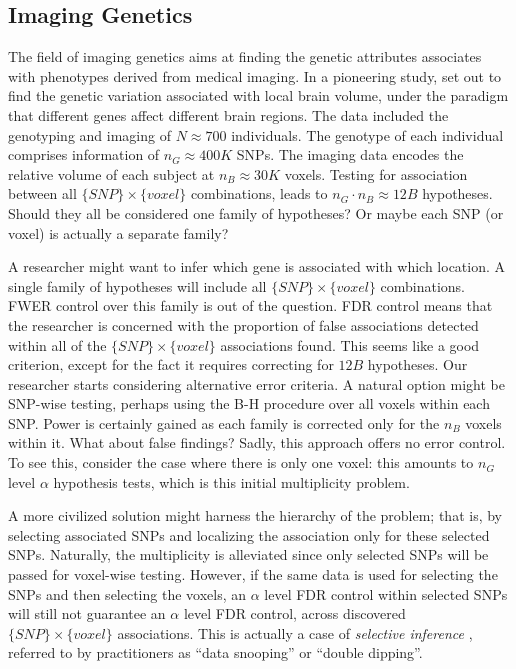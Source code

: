 \documentclass[review,12pt]{article}
\theoremstyle{definition}
\theoremstyle{definition}
\begin{document}
\subsection{\label{eg:imaging_genetics}Imaging Genetics}

The field of imaging genetics aims at finding the genetic attributes associates with phenotypes derived from medical imaging. In a pioneering study, \citet{stein_voxelwise_2010} set out to find the genetic variation associated with local brain volume, under the paradigm that different genes affect different brain regions. 
The data included the genotyping and imaging of $N \approx 700$ individuals. 
The genotype of each individual comprises information of $n_G \approx 400K$ SNPs. 
The imaging data encodes the relative volume of each subject at $n_B \approx 30K$ voxels. 
Testing for association between all $\{SNP\} \times \{voxel\}$ combinations, leads to $n_G \cdot n_B \approx 12B$ hypotheses. Should they all be considered one family of hypotheses? Or maybe each SNP (or voxel) is actually a separate family? 

A researcher might want to infer which gene is associated with which location.
A single family of hypotheses will include all $\{SNP\} \times \{voxel\}$ combinations. 
FWER control over this family is out of the question. 
FDR control means that the researcher is concerned with the proportion of false associations detected within all of the $\{SNP\} \times \{voxel\}$ associations found. This seems like a good criterion, except for the fact it requires correcting for $12B$ hypotheses. 
Our researcher starts considering alternative error criteria. 
A natural option might be SNP-wise testing, perhaps using the B-H procedure over all voxels within each SNP. Power is certainly gained as each family is corrected only for the $n_B$ voxels within it. 
What about false findings? Sadly, this approach offers no error control. To see this, consider the case where there is only one voxel: this amounts to $n_G$ level $\alpha$ hypothesis tests, which is this initial multiplicity problem. 

A more civilized solution might harness the hierarchy of the problem; that is, by selecting associated SNPs and localizing the association only for these selected SNPs. 
Naturally, the multiplicity is alleviated since only selected SNPs will be passed for voxel-wise testing. However, if the same data is used for selecting the SNPs and then selecting the voxels, an $\alpha$ level FDR control within selected SNPs will still not guarantee an $\alpha$ level FDR control, across discovered $\{SNP\} \times \{voxel\}$ associations. This is actually a case of \emph{selective inference} \citep{benjamini_simultaneous_2010}, referred to by practitioners as ``data snooping'' or ``double dipping''. 
\end{document}
